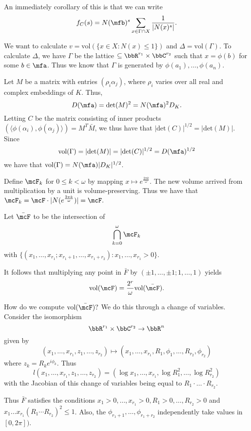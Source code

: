 \documentclass[a4paper, 12pt,oneside,openany]{book}
\begin{document}
An immediately corollary of this is that we can write $$f_C(s)=N(\mfb)^s \sum\limits_{x\in \Gamma \cap X} \frac{1}{|N(x)^s|}.$$

We want to calculate $v = \text{vol}(\{x \in X: N(x)\leq 1\})$ and $\Delta=\text{vol}(\Gamma)$. To calculate $\Delta$, we have $\Gamma$ be the lattice $\subseteq \bbR^{r_1}\times \bbC^{r_2}$ such that $x =\phi(b)$ for some $b \in \mfa$. Thus we know that $\Gamma$ is generated by $\phi(a_1), \dots, \phi(a_n).$ 

Let $M$ be a matrix with entries $(\rho_i\alpha_j)$, where $\rho_i$ varies over all real and complex embeddings of $K$. Thus, $$D(\mfa)=\text{det}(M)^2 = N(\mfa)^2 D_K.$$ Letting $C$ be the matrix consisting of inner products $(\langle \phi(\alpha_i), \phi(\alpha_j)\rangle)=M^T \bar{M}$, we thus have that $|\text{det}(C)|^{1/2}=|\text{det}(M)|.$ Since $$\text{vol}(\Gamma)=|\text{det}(M)|=|\text{det}(C)|^{1/2}=D(\mfa)^{1/2}$$ we have that $\text{vol}(\Gamma)=N(\mfa) |D_K|^{1/2}$. 


 Define $\mcF_k$ for $0 \leq k < \omega$ by mapping $x \mapsto e^{\frac{2\pi k}{\omega}}$. The new volume arrived from multiplication by a unit is volume-preserving. Thus we have that $\mcF_k=\mcF \cdot |N(e^{\frac{2\pi k}{\omega}})|=\mcF.$

Let $\bar{\mcF}$ to be the intersection of $$\bigcap\limits_{k=0}^{\omega} \mcF_k$$ with $\{(x_1, \dots, x_{r_1}; x_{r_1+1}, \dots, x_{r_1+r_2}): x_1, \dots, x_{r_1} >0\}.$ 
 
It follows that multiplying any point in $\bar{F}$ by $(\pm1, \dots, \pm1; 1, \dots, 1)$ yields $$\text{vol}(\mcF) = \frac{2^r}{\omega} \text{vol}(\bar{\mcF}).$$
 
How do we compute $\text{vol}(\bar{\mcF})?$ We do this through a change of variables. Consider the isomorphism $$\bbR^{r_1}\times \bbC^{r_2} \to \bbR^n$$ given by $$(x_1, \dots, x_{r_1}, z_1, \dots, z_{r_2})\mapsto (x_1, \dots, x_{r_1}, R_1, \phi_1, \dots, R_{r_2}, \phi_{r_2})$$ where $z_k = R_ke^{i\phi_k}$. Thus $$l(x_1, \dots, x_{r_1}, z_1, \dots, z_{r_2})=(\log x_1, \dots, x_{r_1}, \log R_1^2, \dots, \log R_{r_2}^2)$$ with the Jacobian of this change of variables being equal to $R_1\cdot\dots\cdot R_{r_2}$.

Thus $\bar{F}$ satisfies the conditions $x_1>0, \dots, x_{r_1}>0, R_1>0, \dots, R_{r_2} > 0$ and $x_1\dots x_{r_1} (R_1\cdots R_{r_2})^2 \leq 1$. Also, the $\phi_{r_1+1}, \dots, \phi_{r_1+r_2}$ independently take values in $[0, 2\pi])$.
\end{document}
